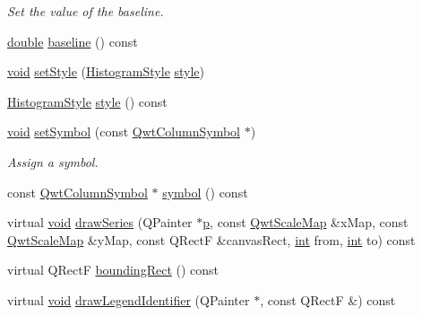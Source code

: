 \begin{DoxyCompactItemize}
\begin{DoxyCompactList}\small\item\em Set the value of the baseline. \end{DoxyCompactList}\item 
\hyperlink{_super_l_u_support_8h_a8956b2b9f49bf918deed98379d159ca7}{double} \hyperlink{class_qwt_plot_histogram_a1e15762e54960e7b1de75b542e8024bd}{baseline} () const 
\item 
\hyperlink{group___u_a_v_objects_plugin_ga444cf2ff3f0ecbe028adce838d373f5c}{void} \hyperlink{class_qwt_plot_histogram_a449af026888616f08b45e980d9da57fe}{set\-Style} (\hyperlink{class_qwt_plot_histogram_a3ba21c3aef994daf7b848ccf71b0dbc5}{Histogram\-Style} \hyperlink{class_qwt_plot_histogram_a00915a951baa4fb251f5614cb0dd8aa9}{style})
\item 
\hyperlink{class_qwt_plot_histogram_a3ba21c3aef994daf7b848ccf71b0dbc5}{Histogram\-Style} \hyperlink{class_qwt_plot_histogram_a00915a951baa4fb251f5614cb0dd8aa9}{style} () const 
\item 
\hyperlink{group___u_a_v_objects_plugin_ga444cf2ff3f0ecbe028adce838d373f5c}{void} \hyperlink{class_qwt_plot_histogram_aa662f072a1758bfac9c0c86136ee27ad}{set\-Symbol} (const \hyperlink{class_qwt_column_symbol}{Qwt\-Column\-Symbol} $\ast$)
\begin{DoxyCompactList}\small\item\em Assign a symbol. \end{DoxyCompactList}\item 
const \hyperlink{class_qwt_column_symbol}{Qwt\-Column\-Symbol} $\ast$ \hyperlink{class_qwt_plot_histogram_a5815e991c891210789fef0295047f790}{symbol} () const 
\item 
virtual \hyperlink{group___u_a_v_objects_plugin_ga444cf2ff3f0ecbe028adce838d373f5c}{void} \hyperlink{class_qwt_plot_histogram_a588eb9f56482fe8669c4d6eaa2db09e2}{draw\-Series} (Q\-Painter $\ast$\hyperlink{glext_8h_aa5367c14d90f462230c2611b81b41d23}{p}, const \hyperlink{class_qwt_scale_map}{Qwt\-Scale\-Map} \&x\-Map, const \hyperlink{class_qwt_scale_map}{Qwt\-Scale\-Map} \&y\-Map, const Q\-Rect\-F \&canvas\-Rect, \hyperlink{ioapi_8h_a787fa3cf048117ba7123753c1e74fcd6}{int} from, \hyperlink{ioapi_8h_a787fa3cf048117ba7123753c1e74fcd6}{int} to) const 
\item 
virtual Q\-Rect\-F \hyperlink{class_qwt_plot_histogram_a683686684263a384cd609c484330bb1f}{bounding\-Rect} () const 
\item 
virtual \hyperlink{group___u_a_v_objects_plugin_ga444cf2ff3f0ecbe028adce838d373f5c}{void} \hyperlink{class_qwt_plot_histogram_a8bf6410cab08923d02e7167321b3c926}{draw\-Legend\-Identifier} (Q\-Painter $\ast$, const Q\-Rect\-F \&) const 
\end{DoxyCompactItemize}
